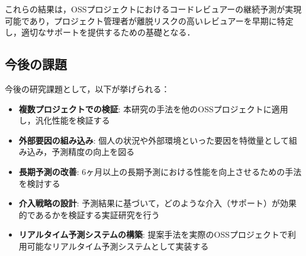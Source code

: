 これらの結果は，OSSプロジェクトにおけるコードレビュアーの継続予測が実現可能であり，プロジェクト管理者が離脱リスクの高いレビュアーを早期に特定し，適切なサポートを提供するための基礎となる．

\subsection{今後の課題}
今後の研究課題として，以下が挙げられる：

\begin{itemize}
    \item \textbf{複数プロジェクトでの検証}: 本研究の手法を他のOSSプロジェクトに適用し，汎化性能を検証する
    \item \textbf{外部要因の組み込み}: 個人の状況や外部環境といった要因を特徴量として組み込み，予測精度の向上を図る
    \item \textbf{長期予測の改善}: 6ヶ月以上の長期予測における性能を向上させるための手法を検討する
    \item \textbf{介入戦略の設計}: 予測結果に基づいて，どのような介入（サポート）が効果的であるかを検証する実証研究を行う
    \item \textbf{リアルタイム予測システムの構築}: 提案手法を実際のOSSプロジェクトで利用可能なリアルタイム予測システムとして実装する
\end{itemize}